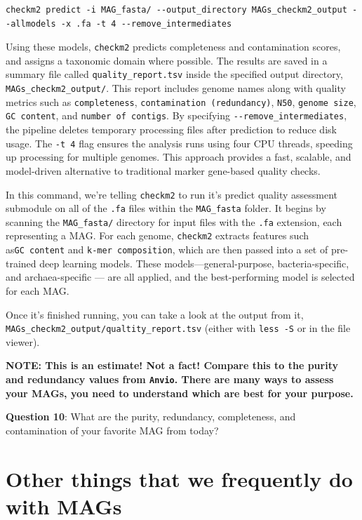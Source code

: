 \documentclass[
]{book}
\begin{document}
\begin{verbatim}
checkm2 predict -i MAG_fasta/ --output_directory MAGs_checkm2_output --allmodels -x .fa -t 4 --remove_intermediates
\end{verbatim}

Using these models, \texttt{checkm2} predicts completeness and contamination scores, and assigns a taxonomic domain where possible. The results are saved in a summary file called \texttt{quality\_report.tsv} inside the specified output directory, \texttt{MAGs\_checkm2\_output/}. This report includes genome names along with quality metrics such as \texttt{completeness}, \texttt{contamination\ (redundancy)}, \texttt{N50}, \texttt{genome\ size}, \texttt{GC\ content}, and \texttt{number\ of\ contigs}. By specifying \texttt{-\/-remove\_intermediates}, the pipeline deletes temporary processing files after prediction to reduce disk usage. The \texttt{-t\ 4} flag ensures the analysis runs using four CPU threads, speeding up processing for multiple genomes. This approach provides a fast, scalable, and model-driven alternative to traditional marker gene-based quality checks.

In this command, we're telling \texttt{checkm2} to run it's predict quality assessment submodule on all of the \texttt{.fa} files within the \texttt{MAG\_fasta} folder. It begins by scanning the \texttt{MAG\_fasta/} directory for input files with the \texttt{.fa} extension, each representing a MAG. For each genome, \texttt{checkm2} extracts features such as\texttt{GC\ content} and \texttt{k-mer\ composition}, which are then passed into a set of pre-trained deep learning models. These models---general-purpose, bacteria-specific, and archaea-specific --- are all applied, and the best-performing model is selected for each MAG.

Once it's finished running, you can take a look at the output from it, \texttt{MAGs\_checkm2\_output/qualtity\_report.tsv} (either with \texttt{less\ -S} or in the file viewer).

\textbf{NOTE: This is an estimate! Not a fact! Compare this to the purity and redundancy values from \texttt{Anvi\textquotesingle{}o}. There are many ways to assess your MAGs, you need to understand which are best for your purpose.}

\textbf{Question 10}: What are the purity, redundancy, completeness, and contamination of your favorite MAG from today?

\section{Other things that we frequently do with MAGs}\label{other-things-that-we-frequently-do-with-mags}
\end{document}
